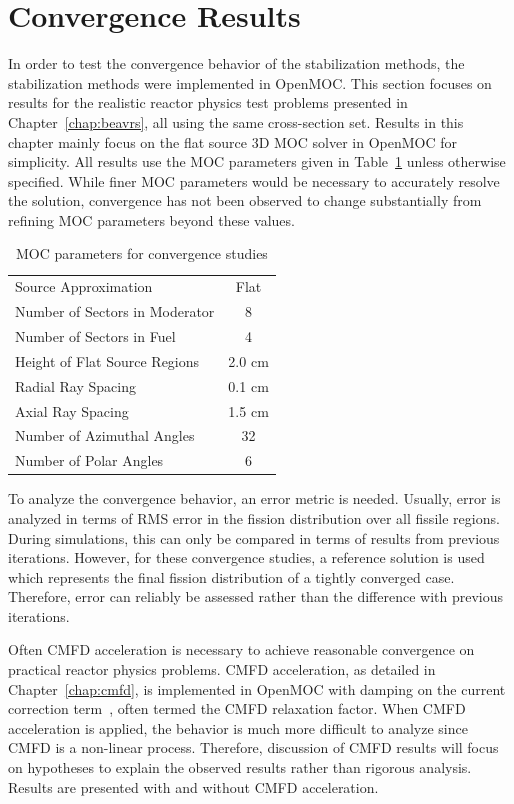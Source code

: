 \section{Convergence Results}
\label{sec:convergence-results}

In order to test the convergence behavior of the stabilization methods, the stabilization methods were implemented in OpenMOC. This section focuses on results for the realistic reactor physics test problems presented in Chapter~\ref{chap:beavrs}, all using the same cross-section set. Results in this chapter mainly focus on the flat source 3D \ac{MOC} solver in OpenMOC for simplicity. All results use the \ac{MOC} parameters given in Table~\ref{tab:convergence-tests-params} unless otherwise specified. While finer \ac{MOC} parameters would be necessary to accurately resolve the solution, convergence has not been observed to change substantially from refining \ac{MOC} parameters beyond these values.

\begin{table}[ht]
	\centering
	\caption{MOC parameters for convergence studies}
	\medskip
	\begin{tabular}{lc}
		\hline
		Source Approximation & Flat \\
		Number of Sectors in Moderator & 8 \\
		Number of Sectors in Fuel & 4 \\
		Height of Flat Source Regions & 2.0 cm \\
		Radial Ray Spacing & 0.1 cm \\
		Axial Ray Spacing & 1.5 cm \\
		Number of Azimuthal Angles & 32 \\
		Number of Polar Angles & 6 \\
		\hline
	\end{tabular}
	\label{tab:convergence-tests-params}
\end{table}

To analyze the convergence behavior, an error metric is needed. Usually, error is analyzed in terms of \ac{RMS} error in the fission distribution over all fissile regions. During simulations, this can only be compared in terms of results from previous iterations. However, for these convergence studies, a reference solution is used which represents the final fission distribution of a tightly converged case. Therefore, error can reliably be assessed rather than the difference with previous iterations.

Often \ac{CMFD} acceleration is necessary to achieve reasonable convergence on practical reactor physics problems. \ac{CMFD} acceleration, as detailed in Chapter~\ref{chap:cmfd}, is implemented in OpenMOC with damping on the current correction term~\cite{smith2002casmo}, often termed the \ac{CMFD} relaxation factor. When \ac{CMFD} acceleration is applied, the behavior is much more difficult to analyze since \ac{CMFD} is a non-linear process. Therefore, discussion of \ac{CMFD} results will focus on hypotheses to explain the observed results rather than rigorous analysis. Results are presented with and without \ac{CMFD} acceleration.

